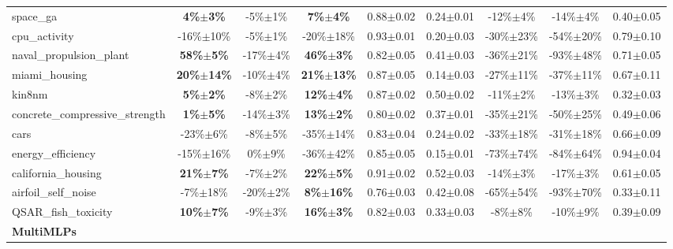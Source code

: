 \begin{table}
\begin{small}
\begin{sc}
{\begin{tabular}{lcccccccc}
space\_ga  &  \textbf{4\%$\pm$3\%}  &  -5\%$\pm$1\%  &  \textbf{7\%$\pm$4\%}  &  0.88$\pm$0.02  &  0.24$\pm$0.01  &  -12\%$\pm$4\%  &  -14\%$\pm$4\%  &  0.40$\pm$0.05 \\
cpu\_activity  &  -16\%$\pm$10\%  &  -5\%$\pm$1\%  &  -20\%$\pm$18\%  &  0.93$\pm$0.01  &  0.20$\pm$0.03  &  -30\%$\pm$23\%  &  -54\%$\pm$20\%  &  0.79$\pm$0.10 \\
naval\_propulsion\_plant  &  \textbf{58\%$\pm$5\%}  &  -17\%$\pm$4\%  &  \textbf{46\%$\pm$3\%}  &  0.82$\pm$0.05  &  0.41$\pm$0.03  &  -36\%$\pm$21\%  &  -93\%$\pm$48\%  &  0.71$\pm$0.05 \\
miami\_housing  &  \textbf{20\%$\pm$14\%}  &  -10\%$\pm$4\%  &  \textbf{21\%$\pm$13\%}  &  0.87$\pm$0.05  &  0.14$\pm$0.03  &  -27\%$\pm$11\%  &  -37\%$\pm$11\%  &  0.67$\pm$0.11 \\
kin8nm  &  \textbf{5\%$\pm$2\%}  &  -8\%$\pm$2\%  &  \textbf{12\%$\pm$4\%}  &  0.87$\pm$0.02  &  0.50$\pm$0.02  &  -11\%$\pm$2\%  &  -13\%$\pm$3\%  &  0.32$\pm$0.03 \\
concrete\_compressive\_strength  &  \textbf{1\%$\pm$5\%}  &  -14\%$\pm$3\%  &  \textbf{13\%$\pm$2\%}  &  0.80$\pm$0.02  &  0.37$\pm$0.01  &  -35\%$\pm$21\%  &  -50\%$\pm$25\%  &  0.49$\pm$0.06 \\
cars  &  -23\%$\pm$6\%  &  -8\%$\pm$5\%  &  -35\%$\pm$14\%  &  0.83$\pm$0.04  &  0.24$\pm$0.02  &  -33\%$\pm$18\%  &  -31\%$\pm$18\%  &  0.66$\pm$0.09 \\
energy\_efficiency  &  -15\%$\pm$16\%  &  0\%$\pm$9\%  &  -36\%$\pm$42\%  &  0.85$\pm$0.05  &  0.15$\pm$0.01  &  -73\%$\pm$74\%  &  -84\%$\pm$64\%  &  0.94$\pm$0.04 \\
california\_housing  &  \textbf{21\%$\pm$7\%}  &  -7\%$\pm$2\%  &  \textbf{22\%$\pm$5\%}  &  0.91$\pm$0.02  &  0.52$\pm$0.03  &  -14\%$\pm$3\%  &  -17\%$\pm$3\%  &  0.61$\pm$0.05 \\
airfoil\_self\_noise  &  -7\%$\pm$18\%  &  -20\%$\pm$2\%  &  \textbf{8\%$\pm$16\%}  &  0.76$\pm$0.03  &  0.42$\pm$0.08  &  -65\%$\pm$54\%  &  -93\%$\pm$70\%  &  0.33$\pm$0.11 \\
QSAR\_fish\_toxicity  &  \textbf{10\%$\pm$7\%}  &  -9\%$\pm$3\%  &  \textbf{16\%$\pm$3\%}  &  0.82$\pm$0.03  &  0.33$\pm$0.03  &  -8\%$\pm$8\%  &  -10\%$\pm$9\%  &  0.39$\pm$0.09 \\
\cmidrule(lr){1-9}
\textbf{MultiMLPs} & & & & & & & & \\ \cmidrule(lr){1-9}


\end{tabular}}
\end{sc}
\end{small}
\end{table}
